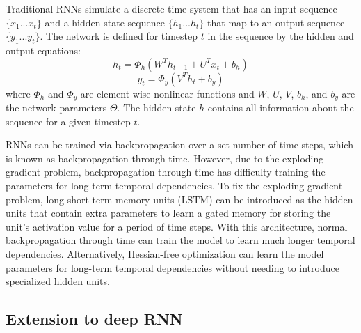 Traditional RNNs simulate a discrete-time system that has an input sequence \(\{x_1...x_t\}\) and a hidden state sequence \(\{h_1...h_t\}\) that map to an output sequence \(\{y_1...y_t\}\). The network is defined for timestep \(t\) in the sequence by the hidden and output equations:
\begin{equation}
	h_t = \Phi_h(W^Th_{t-1} + U^Tx_t + b_h)
\end{equation}
\begin{equation}
	y_t = \Phi_y(V^Th_t + b_y)
\end{equation}
where \(\Phi_h\) and \(\Phi_y\) are element-wise nonlinear functions and \(W\), \(U\), \(V\), \(b_h\), and \(b_y\) are the network parameters \(\Theta\). The hidden state \(h\) contains all information about the sequence for a given timestep \(t\).

RNNs can be trained via backpropagation over a set number of time steps, which is known as backpropagation through time. However, due to the exploding gradient problem, backpropagation through time has difficulty training the parameters for long-term temporal dependencies. To fix the exploding gradient problem, long short-term memory units (LSTM) \cite{lstm} can be introduced as the hidden units that contain extra parameters to learn a gated memory for storing the unit's activation value for a period of time steps. With this architecture, normal backpropagation through time can train the model to learn much longer temporal dependencies. Alternatively, Hessian-free optimization \cite{hessian_free} can learn the model parameters for long-term temporal dependencies without needing to introduce specialized hidden units.

\subsection{Extension to deep RNN}
